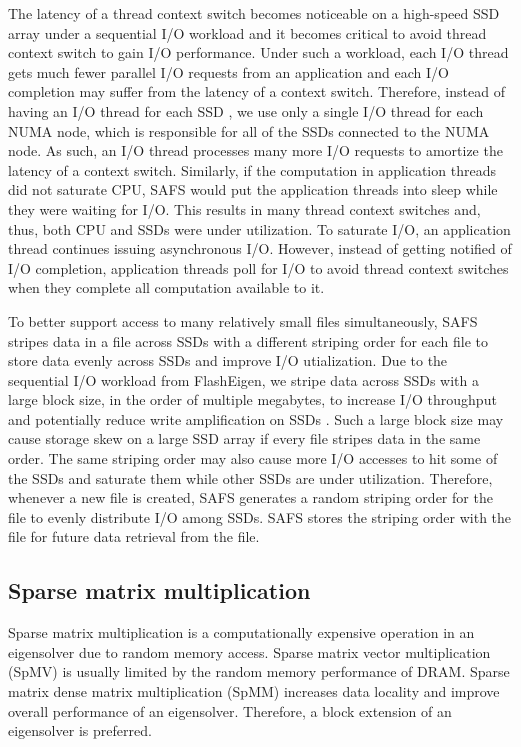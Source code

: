 The latency of a thread context switch becomes noticeable on a high-speed SSD
array under a sequential I/O workload and it becomes critical to avoid thread
context switch to gain I/O performance. Under such a workload, each I/O thread
gets much fewer parallel I/O requests from an application and each I/O completion
may suffer from the latency of a context switch.
Therefore, instead of having an I/O thread for each SSD \cite{safs}, we
use only a single I/O thread for each NUMA node, which is responsible for
all of the SSDs connected to the NUMA node. As such, an I/O thread processes
many more I/O requests to amortize the latency of a context switch.
Similarly, if the computation in application threads did not saturate CPU,
SAFS would put the application threads into sleep while they were waiting
for I/O. This results in many thread context switches and, thus, both CPU and
SSDs were under utilization. To saturate I/O, an application thread continues
issuing asynchronous I/O. However, instead of getting notified of I/O completion,
application threads poll for I/O to avoid thread context switches when they
complete all computation available to it.

To better support access to many relatively small files simultaneously,
SAFS stripes data in a file across SSDs with a different
striping order for each file to store data evenly across SSDs and improve
I/O utialization. Due to the sequential I/O workload from FlashEigen,
we stripe data across SSDs with a large block size, in the order of multiple
megabytes, to increase I/O throughput and potentially reduce write amplification
on SSDs \cite{}. Such a large block size may cause storage skew on a large SSD
array if every file stripes data in the same order.
The same striping order may also cause more I/O accesses to hit some of the SSDs
and saturate them while other SSDs are under utilization. Therefore, whenever
a new file is created, SAFS generates a random striping order for the file to
evenly distribute I/O among SSDs. SAFS stores the striping order with the file
for future data retrieval from the file.



\subsection{Sparse matrix multiplication} \label{spmm}
Sparse matrix multiplication is a computationally expensive
operation in an eigensolver due to random memory access. Sparse matrix vector
multiplication (SpMV) is usually limited by the random memory performance of
DRAM. Sparse matrix dense matrix multiplication (SpMM) increases data locality
and improve overall performance of an eigensolver. Therefore, a block extension
of an eigensolver is preferred.

